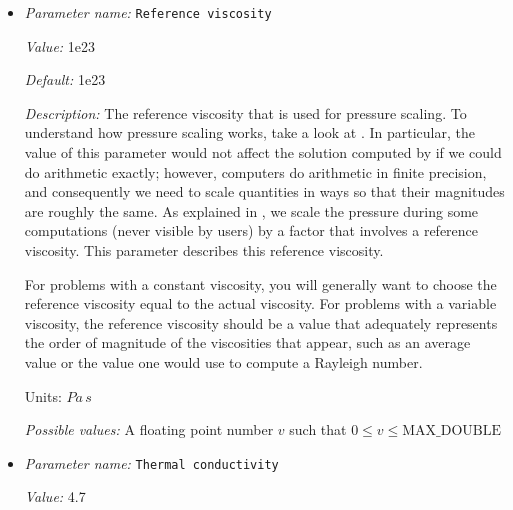 \begin{itemize}
{\it Value:} radial-visc.txt


{\it Default:} radial-visc.txt


{\it Description:} The file name of the radial viscosity data. 


{\it Possible values:} Any string
\item {\it Parameter name:} {\tt Reference viscosity}
\label{parameters:Material model/Steinberger model/Reference viscosity}
\label{parameters:Material_20model/Steinberger_20model/Reference_20viscosity}


{\it Value:} 1e23


{\it Default:} 1e23


{\it Description:} The reference viscosity that is used for pressure scaling. To understand how pressure scaling works, take a look at \cite{KHB12}. In particular, the value of this parameter would not affect the solution computed by \aspect{} if we could do arithmetic exactly; however, computers do arithmetic in finite precision, and consequently we need to scale quantities in ways so that their magnitudes are roughly the same. As explained in \cite{KHB12}, we scale the pressure during some computations (never visible by users) by a factor that involves a reference viscosity. This parameter describes this reference viscosity.

For problems with a constant viscosity, you will generally want to choose the reference viscosity equal to the actual viscosity. For problems with a variable viscosity, the reference viscosity should be a value that adequately represents the order of magnitude of the viscosities that appear, such as an average value or the value one would use to compute a Rayleigh number.

Units: $Pa \, s$


{\it Possible values:} A floating point number $v$ such that $0 \leq v \leq \text{MAX\_DOUBLE}$
\item {\it Parameter name:} {\tt Thermal conductivity}
\label{parameters:Material model/Steinberger model/Thermal conductivity}
\label{parameters:Material_20model/Steinberger_20model/Thermal_20conductivity}


{\it Value:} 4.7



\end{itemize}
